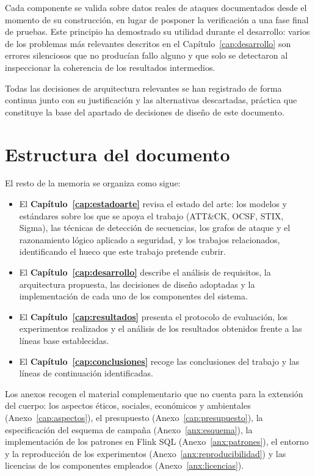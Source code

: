 Cada componente se valida sobre datos reales de ataques documentados desde el momento de su
construcción, en lugar de posponer la verificación a una fase final de pruebas. Este
principio ha demostrado su utilidad durante el desarrollo: varios de los problemas más
relevantes descritos en el Capítulo~\ref{cap:desarrollo} son errores silenciosos que no
producían fallo alguno y que solo se detectaron al inspeccionar la coherencia de los
resultados intermedios.

Todas las decisiones de arquitectura relevantes se han registrado de forma continua junto
con su justificación y las alternativas descartadas, práctica que constituye la base del
apartado de decisiones de diseño de este documento.

\section{Estructura del documento}

El resto de la memoria se organiza como sigue:

\begin{itemize}
    \item El \textbf{Capítulo~\ref{cap:estadoarte}} revisa el estado del arte: los modelos y
    estándares sobre los que se apoya el trabajo (ATT\&CK, OCSF, STIX, Sigma), las técnicas
    de detección de secuencias, los grafos de ataque y el razonamiento lógico aplicado a
    seguridad, y los trabajos relacionados, identificando el hueco que este trabajo pretende
    cubrir.

    \item El \textbf{Capítulo~\ref{cap:desarrollo}} describe el análisis de requisitos, la
    arquitectura propuesta, las decisiones de diseño adoptadas y la implementación de cada
    uno de los componentes del sistema.

    \item El \textbf{Capítulo~\ref{cap:resultados}} presenta el protocolo de evaluación, los
    experimentos realizados y el análisis de los resultados obtenidos frente a las líneas
    base establecidas.

    \item El \textbf{Capítulo~\ref{cap:conclusiones}} recoge las conclusiones del trabajo y
    las líneas de continuación identificadas.

\end{itemize}

Los anexos recogen el material complementario que no cuenta para la extensión del cuerpo: los
aspectos éticos, sociales, económicos y ambientales (Anexo~\ref{cap:aspectos}), el presupuesto
(Anexo~\ref{cap:presupuesto}), la especificación del esquema de campaña
(Anexo~\ref{anx:esquema}), la implementación de los patrones en Flink SQL
(Anexo~\ref{anx:patrones}), el entorno y la reproducción de los experimentos
(Anexo~\ref{anx:reproducibilidad}) y las licencias de los componentes empleados
(Anexo~\ref{anx:licencias}).
